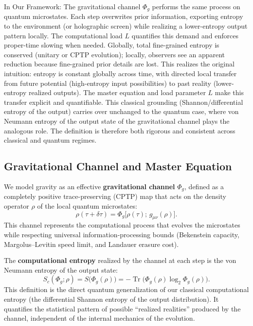 \documentclass[reprint,amsmath,amssymb,aps,prd,preprintnumbers,superscriptaddress,longbibliography,10pt]{revtex4-2}
\begin{document}
In Our Framework: The gravitational channel \(\Phi_g\) performs the same process on quantum microstates. Each step overwrites prior information, exporting entropy to the environment (or holographic screen) while realizing a lower-entropy output pattern locally. The computational load \(L\) quantifies this demand and enforces proper-time slowing when needed. Globally, total fine-grained entropy is conserved (unitary or CPTP evolution); locally, observers see an apparent reduction because fine-grained prior details are lost. This realizes the original intuition: entropy is constant globally across time, with directed local transfer from future potential (high-entropy input possibilities) to past reality (lower-entropy realized outputs). The master equation and load parameter \(L\) make this transfer explicit and quantifiable. This classical grounding (Shannon/differential entropy of the output) carries over unchanged to the quantum case, where von Neumann entropy of the output state of the gravitational channel plays the analogous role. The definition is therefore both rigorous and consistent across classical and quantum regimes.

\subsection{Gravitational Channel and Master Equation}
We model gravity as an effective \textbf{gravitational channel} \(\Phi_g\), defined as a completely positive trace-preserving (CPTP) map that acts on the density operator \(\rho\) of the local quantum microstates:
\[
\rho(\tau + \delta\tau) = \Phi_g\bigl[\rho(\tau);\, g_{\mu\nu}(\rho)\bigr].
\]
This channel represents the computational process that evolves the microstates while respecting universal information-processing bounds (Bekenstein capacity, Margolus–Levitin speed limit, and Landauer erasure cost).

The \textbf{computational entropy} realized by the channel at each step is the von Neumann entropy of the output state:
\[
S_c(\Phi_g;\rho) = S\bigl(\Phi_g(\rho)\bigr) = -\operatorname{Tr}\bigl(\Phi_g(\rho)\log_2\Phi_g(\rho)\bigr).
\]
This definition is the direct quantum generalization of our classical computational entropy (the differential Shannon entropy of the output distribution). It quantifies the statistical pattern of possible “realized realities” produced by the channel, independent of the internal mechanics of the evolution.
\end{document}
